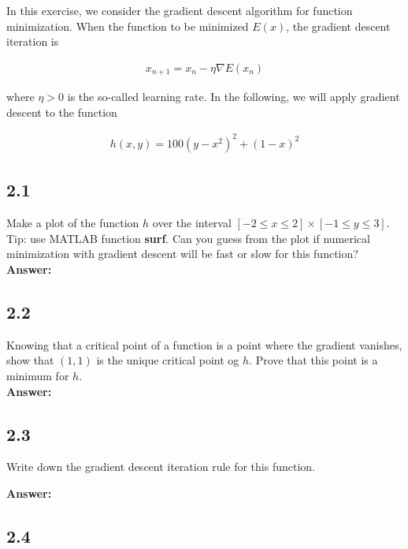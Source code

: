 \documentclass[a4paper]{article}
\begin{document}
In this exercise, we consider the gradient descent algorithm for function minimization. When the function to be minimized $E(x)$, the gradient descent iteration is

\begin{align*}
	x_{n+1} = x_n - \eta \nabla E(x_n)
\end{align*}

where $\eta > 0$ is the so-called learning rate. In the following, we will apply gradient descent to the function

\begin{align*}
	h(x,y) = 100(y - x^2)^2 + (1 - x)^2
\end{align*}

\subsection*{2.1}

Make a plot of the function $h$ over the interval $[-2 \leq x \leq 2] \times [-1 \leq y \leq 3]$. Tip: use MATLAB function \textbf{surf}. Can you guess from the plot if numerical minimization with gradient descent will be fast or slow for this function?\\

\textbf{Answer:}\\

\subsection*{2.2}

Knowing that a critical point of a function is a point where the gradient vanishes, show that $(1,1)$ is the unique critical point og $h$. Prove that this point is a minimum for $h$.\\

\textbf{Answer:}\\


\subsection*{2.3}

Write down the gradient descent iteration rule for this function.

\textbf{Answer:}\\


\subsection*{2.4}
\end{document}
